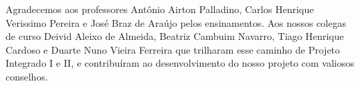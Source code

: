 \begin{agradecimentos}
    Agradecemos aos professores Antônio Airton Palladino, Carlos Henrique Verissimo Pereira e José Braz de Araújo pelos ensinamentos.
    Aos nossos colegas de curso Deivid Aleixo de Almeida, Beatriz Cambuim Navarro, Tiago Henrique Cardoso e Duarte Nuno Vieira Ferreira que trilharam esse caminho de Projeto Integrado I e II, e contribuíram ao desenvolvimento do nosso projeto com valiosos conselhos.
    
    

\end{agradecimentos}
